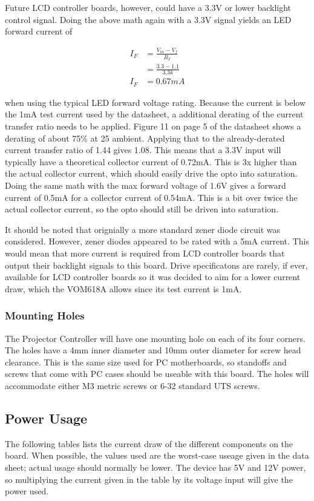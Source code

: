 \documentclass{article}
\begin{document}
Future LCD controller boards, however, could have a 3.3V or lower backlight control signal.  Doing
the above math again with a 3.3V signal yields an LED forward current of

\begin{align*}
    I_F &= \frac{V_{in} - V_f}{R_I} \\
    &= \frac{3.3 - 1.1}{3.3k} \\
    I_F &= 0.67mA
\end{align*}

when using the typical LED forward voltage rating.  Because the current is below the 1mA test
current used by the datasheet, a additional derating of the current transfer ratio needs to be
applied.  Figure 11 on page 5 of the datasheet shows a derating of about 75\% at 25\textcelsius{}
ambient.  Applying that to the already-derated current transfer ratio of 1.44 gives 1.08.  This
means that a 3.3V input will typically have a theoretical collector current of 0.72mA.  This is 3x
higher than the actual collector current, which should easily drive the opto into saturation.  Doing
the same math with the max forward voltage of 1.6V gives a forward current of 0.5mA for a collector
current of 0.54mA.  This is a bit over twice the actual collector current, so the opto should still
be driven into saturation.

It should be noted that orignially a more standard zener diode circuit was considered.  However,
zener diodes appeared to be rated with a 5mA current.  This would mean that more current is required
from LCD controller boards that output their backlight signals to this board.  Drive specificatons
are rarely, if ever, available for LCD controller boards so it was decided to aim for a lower
current draw, which the VOM618A allows since its test current is 1mA.

\subsubsection{Mounting Holes} \label{sssec:MountingHoles}
The Projector Controller will have one mounting hole on each of its four corners.  The holes have a
4mm inner diameter and 10mm outer diameter for screw head clearance.  This is the same size used for
PC motherboards, so standoffs and screws that come with PC cases should be useable with this board.
The holes will accommodate either M3 metric screws or 6-32 standard UTS screws.


\subsection{Power Usage} \label{ssec:PowerUsage}
The following tables lists the current draw of the different components on the board.  When
possible, the values used are the worst-case useage given in the data sheet; actual usage should
normally be lower.  The device has 5V and 12V power, so multiplying the current given in the table
by its voltage input will give the power used.
\end{document}
